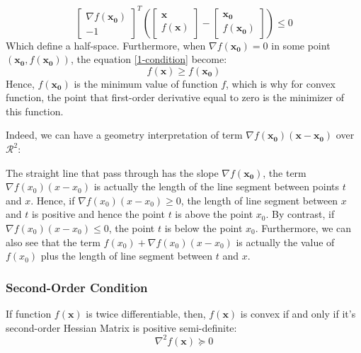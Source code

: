 \documentclass[10pt,a4paper]{article}
\begin{document}
\begin{equation*}
	\begin{bmatrix}
	\nabla f(\mathbf{x_{0}}) \\
	-1
	\end{bmatrix} ^{T}(
	\begin{bmatrix}
		\mathbf{x} \\
		f(\mathbf{x})
	\end{bmatrix} - 
	\begin{bmatrix}
		\mathbf{x_{0}} \\
		f(\mathbf{x_{0}})
	\end{bmatrix}) \leq 0
\end{equation*}
Which define a half-space. Furthermore, when $\nabla f(\mathbf{x_{0}}) = 0$ in some point $(\mathbf{x_{0}}, f(\mathbf{x_{0}}))$, the equation \ref{1-condition} become:
\begin{equation*}
	f(\mathbf{x}) \geq f(\mathbf{x_{0}})
\end{equation*}
Hence, $f(\mathbf{x_{0}})$ is the minimum value of function $f$, which is why for convex function, the point that first-order derivative equal to zero is the minimizer of this function.

Indeed, we can have a geometry interpretation of term $\nabla f(\mathbf{x_{0}}) (\mathbf{x} - \mathbf{x_{0}})$ over $\mathcal{R}^{2}$:
\begin{center}
\end{center}
The straight line that pass through  has the slope $\nabla f(\mathbf{x_{0}})$, the term $\nabla f(x_{0})(x - x_{0})$ is actually the length of the line segment between points $t$ and $x$. Hence, if $\nabla f(x_{0})(x - x_{0}) \geq 0$, the length of line segment between $x$ and $t$ is positive and hence the point $t$ is above the point $x_{0}$. By contrast, if $\nabla f(x_{0})(x - x_{0}) \leq 0$, the point $t$ is below the point $x_{0}$. Furthermore, we can also see that the term $f(x_{0}) + \nabla f(x_{0})(x - x_{0})$ is actually the value of $f(x_{0})$ plus the length of line segment between $t$ and $x$.
\subsubsection{Second-Order Condition}
If function $f(\mathbf{x})$ is twice differentiable, then, $f(\mathbf{x})$ is convex if and only if it's second-order Hessian Matrix is positive semi-definite:
\begin{equation}
	\nabla^{2} f(\mathbf{x}) \succeq 0
\end{equation}
\end{document}
